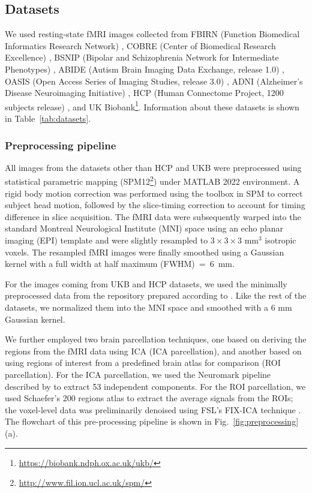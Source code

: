 \documentclass[final,5p,times,twocolumn,authoryear]{elsarticle}
\begin{document}
\subsection{Datasets}\label{sec:datasets}

We used resting-state fMRI images collected from FBIRN (Function Biomedical Informatics Research Network) \citep{fbirn}, COBRE (Center of Biomedical Research Excellence) \citep{cobre}, BSNIP (Bipolar and Schizophrenia Network for Intermediate Phenotypes) \citep{bsnip}, ABIDE (Autism Brain Imaging Data Exchange, release 1.0) \citep{abide}, OASIS (Open Access Series of Imaging Studies, release 3.0) \citep{oasis}, ADNI (Alzheimer's Disease Neuroimaging Initiative) \citep{adni}, HCP (Human Connectome Project, 1200 subjects release) \citep{hcp}, and UK Biobank\footnote{\url{https://biobank.ndph.ox.ac.uk/ukb/}}. Information about these datasets is shown in Table~\ref{tab:datasets}.

\subsubsection{Preprocessing pipeline}\label{sec:main_preproc_method}
All images from the datasets other than HCP and UKB were preprocessed using statistical parametric mapping (SPM12\footnote{\url{http://www.fil.ion.ucl.ac.uk/spm/}}) under MATLAB 2022 environment. A rigid body motion correction was performed using the toolbox in SPM to correct subject head motion, followed by the slice-timing correction to account for timing difference in slice acquisition. The fMRI data were subsequently warped into the standard Montreal Neurological Institute (MNI) space using an echo planar imaging (EPI) template and were slightly resampled to $3 \times 3 \times 3$ mm$^3$ isotropic voxels. The resampled fMRI images were finally smoothed using a Gaussian kernel with a full width at half maximum (FWHM)~=~6~mm.

For the images coming from UKB and HCP datasets, we used the minimally preprocessed data from the repository prepared according to \citet{glasser}. Like the rest of the datasets, we normalized them into the MNI space and smoothed with a 6 mm Gaussian kernel.

We further employed two brain parcellation techniques, one based on deriving the regions from the fMRI data using ICA (ICA parcellation), and another based on using regions of interest from a predefined brain atlas for comparison (ROI parcellation). For the ICA parcellation, we used the Neuromark pipeline described by \citet{du2020neuromark} to extract 53 independent components. For the ROI parcellation, we used Schaefer's 200 regions atlas to extract the average signals from the ROIs; the voxel-level data was preliminarily denoised using FSL’s FIX-ICA technique \citep{fsl}. The flowchart of this pre-processing pipeline is shown in Fig.~\ref{fig:preprocessing}(a).
\end{document}
